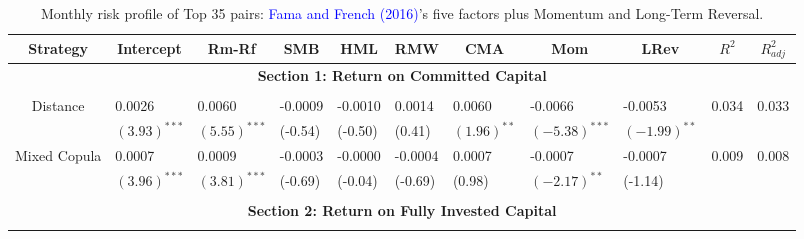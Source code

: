 		\begin{table}[!ht]
		\centering \scriptsize
		\caption{Monthly risk profile of Top 35 pairs: \textcolor{blue}{Fama and French} \textcolor{blue}{(2016)}'s five factors plus Momentum and Long-Term Reversal.}
		\begin{threeparttable}[H]
			\begin{tabularx}{\textwidth}{@{\extracolsep{\fill}} lllllllllll@{}}
				\toprule
				\multicolumn{1}{c}{Strategy} & \multicolumn{1}{c}{Intercept} &  \multicolumn{1}{c}{Rm-Rf} &  \multicolumn{1}{c}{SMB} &  \multicolumn{1}{c}{HML} &  \multicolumn{1}{c}{RMW} &  \multicolumn{1}{c}{CMA} & 
				\multicolumn{1}{c}{Mom} &  \multicolumn{1}{c}{LRev} &  \multicolumn{1}{c}{$R^{2}$} & \multicolumn{1}{c}{$R^{2}_{adj}$} \\
				\midrule
				\multicolumn{11}{c}{\textbf{Section 1: Return on Committed Capital}} \\
				\multicolumn{1}{c}{} & \multicolumn{1}{c}{} & \multicolumn{1}{c}{} & \multicolumn{1}{c}{} & \multicolumn{1}{c}{} & \multicolumn{1}{c}{} & \multicolumn{1}{c}{} & \multicolumn{1}{c}{} & \multicolumn{1}{c}{} & \multicolumn{1}{c}{} & \\
			\multicolumn{1}{c}{Distance} & 0.0026 & 0.0060 & -0.0009 & -0.0010 & 0.0014 & 0.0060 & -0.0066& -0.0053 & 0.034 & 0.033 \\
			\multicolumn{1}{c}{} & $(3.93)^{***}$ & $(5.55)^{***}$ & (-0.54) & (-0.50) & (0.41) & $(1.96)^{**}$ & $(-5.38)^{***}$ & $(-1.99)^{**}$ & & \vspace{.1cm}\\
			\multicolumn{1}{c}{Mixed Copula} & 0.0007 & 0.0009 & -0.0003 & -0.0000 & -0.0004 & 0.0007 & -0.0007 & -0.0007 & 0.009 & 0.008 \\
			\multicolumn{1}{c}{} & $(3.96)^{***}$ & $(3.81)^{***}$ & (-0.69) & (-0.04) & (-0.69) & (0.98) & $(-2.17)^{**}$ & (-1.14) & & \\
				&       &       &       &       &       &       &       &       &       &       \\
				\midrule
				\multicolumn{11}{c}{\textbf{Section 2: Return on Fully Invested Capital}} \\
				&       &       &       &       &       &       &       &       &       &    \\
		

\end{tabularx}
\end{threeparttable}
\end{table}
